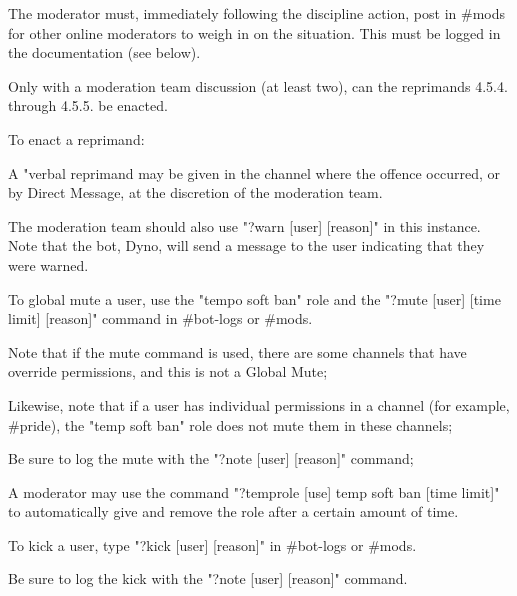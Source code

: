\begin{longenum}[ label*=\thesubsection.\arabic*., align=left]
\begin{longenum}[label*=\arabic*., align=left]
			\begin{longenum}[label*=\arabic*., align=left]
			\item The moderator must, immediately following the discipline action, post in \#mods for other online moderators to weigh in on the situation. This must be logged in the documentation (see below).
			\item Only with a moderation team discussion (at least two), can the reprimands 4.5.4. through 4.5.5. be enacted.
			\end{longenum}	
		\item To enact a reprimand:
			\begin{longenum}[label*=\arabic*., align=left]
			\item A "verbal reprimand may be given in the channel where the offence occurred, or by Direct Message, at the discretion of the moderation team.
				\begin{longenum}[label*=\arabic*., align=left]
				\item The moderation team should also use "?warn [user] [reason]" in this instance. Note that the bot, Dyno, will send a message to the user indicating that they were warned.
				\end{longenum}	
			\item To global mute a user, use the "tempo soft ban" role and the "?mute [user] [time limit] [reason]" command in \#bot-logs or \#mods.
				\begin{longenum}[label*=\arabic*., align=left]
				\item Note that if the mute command is used, there are some channels that have override permissions, and this is not a Global Mute;
				\item Likewise, note that if a user has individual permissions in a channel (for example, \#pride), the "temp soft ban" role does not mute them in these channels;
				\item Be sure to log the mute with the "?note [user] [reason]" command;
				\item A moderator may use the command "?temprole [use] temp soft ban [time limit]" to automatically give and remove the role after a certain amount of time.
				\end{longenum}	
			\item To kick a user, type "?kick [user] [reason]" in \#bot-logs or \#mods.
				\begin{longenum}[label*=\arabic*., align=left]
				\item Be sure to log the kick with the "?note [user] [reason]" command.

\end{longenum}
\end{longenum}
\end{longenum}
\end{longenum}
